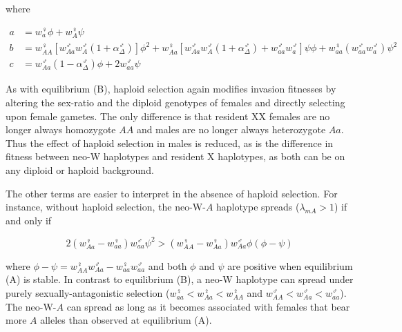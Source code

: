 \documentclass[12pt]{article}
\begin{document}
\noindent
where 

\begin{subequations}
\begin{align}
a &= w_a^\female \phi + w_A^\female \psi \\
b &= w_{AA}^\female \left[ w_{Aa}^\male w_A^\male (1+\alpha^\male_\Delta) \right] \phi^2 + w_{Aa}^\female \left[ w_{Aa}^\male w_A^\male (1+\alpha^\male_\Delta) + w_{aa}^\male w_a^\male \right] \psi \phi + w_{aa}^\female \left( w_{aa}^\male w_a^\male \right) \psi^2\\
c &= w_{Aa}^\male (1-\alpha^\male_\Delta) \phi + 2w_{aa}^\male \psi
\end{align}
\end{subequations}

As with equilibrium (B), haploid selection again modifies invasion fitnesses by altering the sex-ratio and the diploid genotypes of females and directly selecting upon female gametes.
The only difference is that resident XX females are no longer always homozygote $AA$ and males are no longer always heterozygote $Aa$.
Thus the effect of haploid selection in males is reduced, as is the difference in fitness between neo-W haplotypes and resident X haplotypes, as both can be on any diploid or haploid background.  

The other terms are easier to interpret in the absence of haploid selection.
For instance, without haploid selection, the neo-W-$A$ haplotype spreads ($\lambda_{mA}>1$) if and only if

\begin{equation}\label{eq:BeqWAspread}
2(w_{Aa}^\female-w_{aa}^\female)w_{aa}^\male \psi^2 > (w_{AA}^\female-w_{Aa}^\female)w_{Aa}^\male \phi (\phi-\psi)
\end{equation}

\noindent  
where $\phi-\psi=w_{AA}^\female w_{Aa}^\male-w_{aa}^\female w_{aa}^\male$ and both $\phi$ and $\psi$ are positive when equilibrium (A) is stable. 
In contrast to equilibrium (B), a neo-W haplotype can spread under purely sexually-antagonistic selection  ($w_{aa}^\female<w_{Aa}^\female<w_{AA}^\female$ and $w_{AA}^\male<w_{Aa}^\male<w_{aa}^\male$).
The neo-W-$A$ can spread as long as it becomes associated with females that bear more $A$ alleles than observed at equilibrium (A). 
\end{document}
